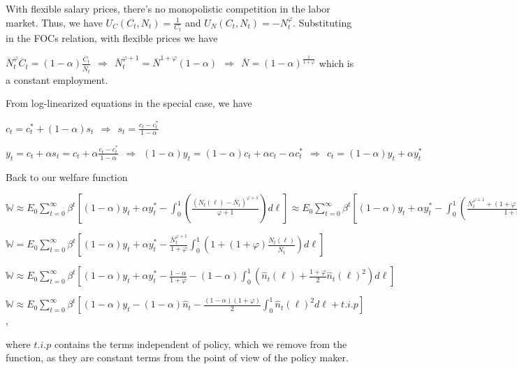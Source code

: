 \documentclass[
]{article}
\begin{document}
With flexible salary prices, there's no monopolistic competition in the
labor market. Thus, we have \(\displaystyle U_C(C_t,N_t)=\frac{1}{C_t}\)
and \(\displaystyle U_N(C_t,N_t)=-N_t^\varphi\). Substituting in the
FOCs relation, with flexible prices we have

\(\displaystyle \overline{N}_t^\varphi \overline{C}_t= (1-\alpha)\frac{\overline{C}_t}{\overline{N}_t} \ \ \Rightarrow \ \ \overline{N}_t^{\varphi+1} = \overline{N}^{1+\varphi}(1-\alpha) \ \ \Rightarrow \ \ \overline{N}=(1-\alpha)^{\frac{1}{1+\varphi}}\)
which is a constant employment.

From log-linearized equations in the special case, we have

\(\displaystyle c_t=c_t^*+(1-\alpha)s_t \ \ \Rightarrow \ \ s_t=\frac{c_t-c_t^*}{1-\alpha}\)

\(\displaystyle y_t=c_t+\alpha s_t=c_t+ \alpha \frac{c_t-c_t^*}{1-\alpha} \ \ \Rightarrow \ \ (1-\alpha) y_t=(1-\alpha)c_t+\alpha c_t-\alpha c_t^* \ \ \Rightarrow \ \ c_t=(1-\alpha)y_t+\alpha y_t^*\)

Back to our welfare function

\(\displaystyle \mathbb{W} \approx E_0 \sum_{t=0}^{\infty} \beta^t \left[ (1-\alpha)y_t+\alpha y_t^* -\int_0^1 \left(\frac{(N_t(\ell)-\overline{N}_t)^{\varphi+1}}{\varphi+1} \right)d\ell \right] \approx E_0 \sum_{t=0}^{\infty} \beta^t \left[ (1-\alpha)y_t+\alpha y_t^* -\int_0^1 \left(\frac{\overline{N}_t^{\varphi+1}+(1+\varphi)N_t(\ell)\overline{N}_t^\varphi}{1+\varphi} \right)d\ell \right]\)

\(\displaystyle \mathbb{W} = E_0 \sum_{t=0}^{\infty} \beta^t \left[ (1-\alpha)y_t+\alpha y_t^* - \frac{\overline{N}_t^{\varphi+1}}{1+\varphi}\int_0^1 \left(1+(1+\varphi)\frac{N_t(\ell)}{\overline{N}_t} \right)d\ell \right]\)

\(\displaystyle \mathbb{W} \approx E_0 \sum_{t=0}^{\infty} \beta^t \left[ (1-\alpha)y_t+\alpha y_t^* - \frac{1-\alpha}{1+\varphi}- (1-\alpha)\int_0^1 \left(\widehat{n}_t(\ell) + \frac{1+\varphi}{2} \widehat{n}_t(\ell)^2 \right)d\ell \right]\)

\(\displaystyle \mathbb{W} \approx E_0 \sum_{t=0}^{\infty} \beta^t \left[ (1-\alpha)y_t- (1-\alpha)\widehat{n}_t - \frac{(1-\alpha)(1+\varphi)}{2}\int_0^1 \widehat{n}_t(\ell)^2 d\ell + t.i.p\right]\),

where \(t.i.p\) contains the terms independent of policy, which we
remove from the function, as they are constant terms from the point of
view of the policy maker.
\end{document}
